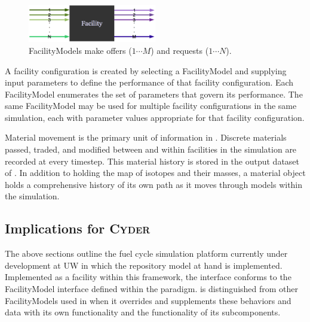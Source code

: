 \begin{figure}[htb!]
  \begin{center}
    \includegraphics[width=0.5\textwidth]{./chapters/paradigm/facility.eps}
  \end{center}
  \caption[\Cyclus FacilityModel offer and request interface.]{\Cyclus FacilityModels make offers ($1\cdots M$) and requests ($1\cdots N$).}
  \label{fig:facility}
\end{figure}


A facility configuration is created by selecting a FacilityModel and supplying 
input parameters to define the performance of that facility configuration.  
Each FacilityModel enumerates the set of parameters that govern its 
performance.  The same FacilityModel may be used for multiple facility 
configurations in the same simulation, each with parameter values appropriate for 
that facility configuration.



Material movement is the primary unit of information in \Cyclus.  
Discrete materials passed, traded, and modified between and within facilities 
in the simulation are recorded at every timestep.  This material 
history is stored in the output dataset of \Cyclus. In addition to 
holding the map of isotopes and their masses, a material object holds 
a comprehensive history of its own path as it moves through models 
within the simulation. 

\subsection{Implications for \textsc{Cyder}}

The above sections outline the \Cyclus fuel cycle simulation platform currently 
under development at \gls{UW} in which the \Cyder repository model at hand is 
implemented.  Implemented as a facility within this framework, the \Cyder 
interface conforms to the FacilityModel interface defined within the \Cyclus 
paradigm.  \Cyder is distinguished from other FacilityModels used in \Cyclus 
when it overrides and supplements these behaviors and data with its own 
functionality and the functionality of its subcomponents.

